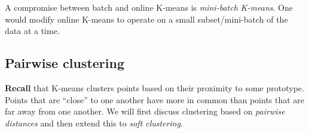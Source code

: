 \begin{frame}
A compromise between batch and online K-means is \emph{mini-batch K-means}.
One would modify online K-means to operate on a small subset/mini-batch of the data at a time.

\end{frame}

\begin{frame}
\section{Pairwise clustering}

\textbf{Recall} that K-means clusters points based on their proximity to some prototype.\\

Points that are ``close'' to one another have more in common than points that are far away from one another. 
We will first discuss clustering based on \emph{pairwise distances} and then extend this to \emph{soft clustering}.

\end{frame}

